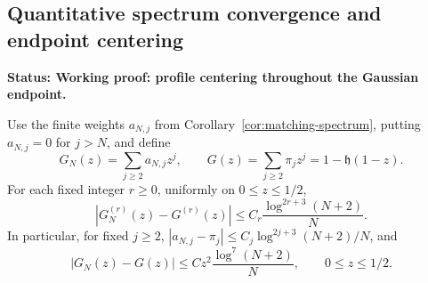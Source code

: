 \documentclass[11pt,letterpaper]{article}
\newcommand{\status}[1]{\textbf{Status: #1.}}
\begin{document}
\subsection{Quantitative spectrum convergence and endpoint centering}
\label{sec:endpoint-centering}

\status{Working proof: profile centering throughout the Gaussian endpoint}

\begin{lemma}
\label{lem:matching-spectrum-derivatives}
Use the finite weights $a_{N,j}$ from
Corollary~\ref{cor:matching-spectrum}, putting $a_{N,j}=0$ for $j>N$,
and define
\[
 G_N(z)=\sum_{j\ge2}a_{N,j}z^j,\qquad
 G(z)=\sum_{j\ge2}\pi_jz^j=1-\mathfrak h(1-z).
\]
For each fixed integer $r\ge0$, uniformly on $0\le z\le1/2$,
\begin{equation}\label{eq:matching-spectrum-derivatives}
 |G_N^{(r)}(z)-G^{(r)}(z)|
       \le C_r\frac{\log^{2r+3}(N+2)}N.
\end{equation}
In particular, for fixed $j\ge2$,
$|a_{N,j}-\pi_j|\le C_j\log^{2j+3}(N+2)/N$, and
\begin{equation}\label{eq:matching-spectrum-quadratic-error}
 |G_N(z)-G(z)|\le
          C z^2\frac{\log^7(N+2)}N,\qquad 0\le z\le1/2.
\end{equation}
\end{lemma}
\end{document}
